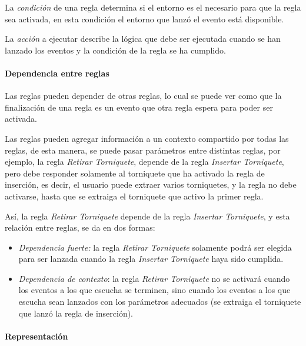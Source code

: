 La \emph{condición} de una regla determina si el entorno es el necesario para que la
regla sea activada, en esta condición el entorno que lanzó el evento está
disponible.

La \emph{acción} a ejecutar describe la lógica que debe ser ejecutada cuando se han
lanzado los eventos y la condición de la regla se ha cumplido.

\paragraph{Dependencia entre reglas}


Las reglas pueden depender de otras reglas, lo cual se puede ver como que la
finalización de una regla es un evento que otra regla espera para poder ser
activada.

Las reglas pueden agregar información a un contexto compartido por todas las
reglas, de esta manera, se puede pasar parámetros entre distintas reglas, por
ejemplo, la regla \emph{Retirar Torniquete}, depende de la regla \emph{Insertar
Torniquete}, pero debe responder solamente al torniquete que ha activado
la regla de inserción, es decir, el usuario puede extraer varios torniquetes, y
la regla no debe activarse, hasta que se extraiga el torniquete que activo la
primer regla.

Así, la regla \emph{Retirar Torniquete} depende de la regla \emph{Insertar
Torniquete}, y esta relación entre reglas, se da en dos
formas\cite{bailey2004event}:

\begin{itemize}
\item  \emph{Dependencia fuerte:} la regla \emph{Retirar Torniquete} solamente podrá
	ser elegida para ser lanzada cuando la regla \emph{Insertar Torniquete}
	haya sido cumplida.
\item  \emph{Dependencia de contexto}: la regla \emph{Retirar Torniquete} no se
	activará cuando los eventos a los que escucha se terminen, sino cuando
	los eventos a los que escucha sean lanzados con los parámetros adecuados
	(se extraiga el torniquete que lanzó la regla de inserción).
\end{itemize}

\paragraph{Representación}

